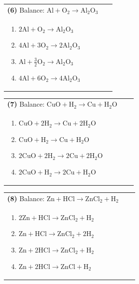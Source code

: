 \documentclass{article}
\begin{document}
{\vspace{0.2cm}
\noindent \begin{tabular}{|p{0.9\linewidth}|}
\hline
\vspace{0.2cm}
\textbf{(6)} Balance: \(\mathrm{Al + O_2 \rightarrow Al_2O_3}\)\\
\begin{minipage}[t]{0.85\linewidth}
\begin{enumerate}[label=\alph*.]
   \item \(\mathrm{2Al + O_2 \rightarrow Al_2O_3}\)
   \item \(\mathrm{4Al + 3O_2 \rightarrow 2Al_2O_3}\)
   \item \(\mathrm{Al + \tfrac{3}{2}O_2 \rightarrow Al_2O_3}\)
   \item \(\mathrm{4Al + 6O_2 \rightarrow 4Al_2O_3}\)
\end{enumerate}
\end{minipage}\\
\hline
\end{tabular}

\vspace{0.2cm}
\noindent \begin{tabular}{|p{0.9\linewidth}|}
\hline
\vspace{0.2cm}
\textbf{(7)} Balance: \(\mathrm{CuO + H_2 \rightarrow Cu + H_2O}\)\\
\begin{minipage}[t]{0.85\linewidth}
\begin{enumerate}[label=\alph*.]
   \item \(\mathrm{CuO + 2H_2 \rightarrow Cu + 2H_2O}\)
   \item \(\mathrm{CuO + H_2 \rightarrow Cu + H_2O}\)
   \item \(\mathrm{2CuO + 2H_2 \rightarrow 2Cu + 2H_2O}\)
   \item \(\mathrm{2CuO + H_2 \rightarrow 2Cu + H_2O}\)
\end{enumerate}
\end{minipage}\\
\hline
\end{tabular}

\vspace{0.2cm}
\noindent \begin{tabular}{|p{0.9\linewidth}|}
\hline
\vspace{0.2cm}
\textbf{(8)} Balance: \(\mathrm{Zn + HCl \rightarrow ZnCl_2 + H_2}\)\\
\begin{minipage}[t]{0.85\linewidth}
\begin{enumerate}[label=\alph*.]
   \item \(\mathrm{2Zn + HCl \rightarrow ZnCl_2 + H_2}\)
   \item \(\mathrm{Zn + HCl \rightarrow ZnCl_2 + 2H_2}\)
   \item \(\mathrm{Zn + 2HCl \rightarrow ZnCl_2 + H_2}\)
   \item \(\mathrm{Zn + 2HCl \rightarrow ZnCl + H_2}\)
\end{enumerate}
\end{minipage}\\
\hline
\end{tabular}
\newpage

}
\end{document}
